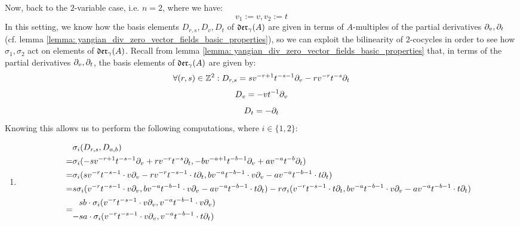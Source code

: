 \begin{example}
            Now, back to the $2$-variable case, i.e. $n = 2$, where we have:
                $$v_1 := v, v_2 := t$$
            In this setting, we know how the basis elements $D_{r, s}, D_v, D_t$ of $\divzero$ are given in terms of $A$-multiples of the partial derivatives $\del_v, \del_t$ (cf. lemma \ref{lemma: yangian_div_zero_vector_fields_basic_properties}), so we can exploit the bilinearity of $2$-cocycles in order to see how $\sigma_1, \sigma_2$ act on elements of $\divzero$. Recall from lemma \ref{lemma: yangian_div_zero_vector_fields_basic_properties} that, in terms of the partial derivatives $\del_v, \del_t$, the basis elements of $\divzero$ are given by:
                $$\forall (r, s) \in \Z^2: D_{r, s} = s v^{-r + 1} t^{-s - 1} \del_v - r v^{-r} t^{-s} \del_t$$
                $$D_v = -v t^{-1} \del_v$$
                $$D_t = -\del_t$$
            Knowing this allows us to perform the following computations, where $i \in \{1, 2\}$:
            \begin{enumerate}
                \item 
                    $$
                        \begin{aligned}
                            & \sigma_i(D_{r, s}, D_{a, b})
                            \\
                            = & \sigma_i( -s v^{-r + 1} t^{-s - 1} \del_v + r v^{-r} t^{-s} \del_t, -b v^{-a + 1} t^{-b - 1} \del_v + a v^{-a} t^{-b} \del_t )
                            \\
                            = & \sigma_i( s v^{-r} t^{-s - 1} \cdot v\del_v - r v^{-r} t^{-s - 1} \cdot t \del_t, b v^{-a} t^{-b - 1} \cdot v\del_v - a v^{-a} t^{-b - 1} \cdot t \del_t )
                            \\
                            = & s \sigma_i( v^{-r} t^{-s - 1} \cdot v\del_v, b v^{-a} t^{-b - 1} \cdot v\del_v - a v^{-a} t^{-b - 1} \cdot t \del_t ) - r \sigma_i( v^{-r} t^{-s - 1} \cdot t \del_t, b v^{-a} t^{-b - 1} \cdot v\del_v - a v^{-a} t^{-b - 1} \cdot t \del_t )
                            \\
                            = &
                            \begin{aligned}
                                & s b \cdot \sigma_i( v^{-r} t^{-s - 1} \cdot v\del_v, v^{-a} t^{-b - 1} \cdot v\del_v )
                                \\
                                - & s a \cdot \sigma_i( v^{-r} t^{-s - 1} \cdot v\del_v, v^{-a} t^{-b - 1} \cdot t \del_t )
                                \\

\end{aligned}
\end{aligned}$$
\end{enumerate}
\end{example}
